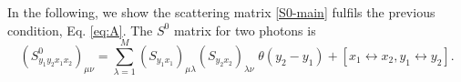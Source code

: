 \documentclass[notitlepage, prx, preprint, amsmath,superscriptaddress,amssymb]{revtex4-1}
\begin{document}
In the following, we show the scattering matrix \eqref{S0-main} fulfils the previous condition, Eq. \eqref{eq:A}. The $S^0$ matrix for two photons is
\begin{equation}\label{eq:S0_2}
(S^0_{y_1y_2x_1x_2})_{\mu\nu} = \sum_{\lambda=1}^M (S_{y_1x_1})_{\mu\lambda}(S_{y_2x_2})_{\lambda\nu}\;\theta(y_2-y_1) + [x_1\leftrightarrow x_2,y_1\leftrightarrow y_2].
\end{equation}
\end{document}
